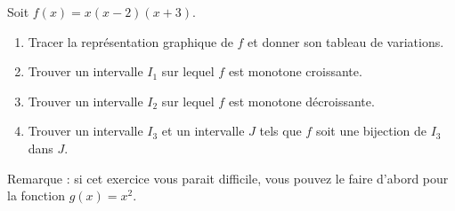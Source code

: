 
\begin{exercice}\label{exostarterST-0004}

Soit $f(x) = x(x-2)(x+3)$. 

\begin{enumerate}
\item Tracer la représentation graphique de $f$ et donner son tableau de variations.
\item Trouver un intervalle $I_1$ sur lequel $f$ est monotone croissante.
\item Trouver un intervalle $I_2$ sur lequel $f$ est monotone décroissante.
\item Trouver un intervalle $I_3$ et un intervalle $J$ tels que $f$ soit une bijection de $I_3$ dans $J$.

\end{enumerate}

Remarque : si cet exercice vous parait difficile, vous pouvez le faire d'abord pour la fonction $g(x) = x^2$. 
  

\end{exercice}
